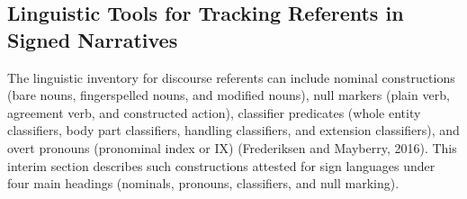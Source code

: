 \documentclass[]{elsarticle} %
\begin{document}
\hypertarget{linguistic-tools-for-tracking-referents-in-signed-narratives}{%
\subsection{Linguistic Tools for Tracking Referents in Signed
Narratives}\label{linguistic-tools-for-tracking-referents-in-signed-narratives}}

The linguistic inventory for discourse referents can include nominal
constructions (bare nouns, fingerspelled nouns, and modified nouns),
null markers (plain verb, agreement verb, and constructed action),
classifier predicates (whole entity classifiers, body part classifiers,
handling classifiers, and extension classifiers), and overt pronouns
(pronominal index or IX) (Frederiksen and Mayberry, 2016). This interim
section describes such constructions attested for sign languages under
four main headings (nominals, pronouns, classifiers, and null marking).

\clearpage
\end{document}
